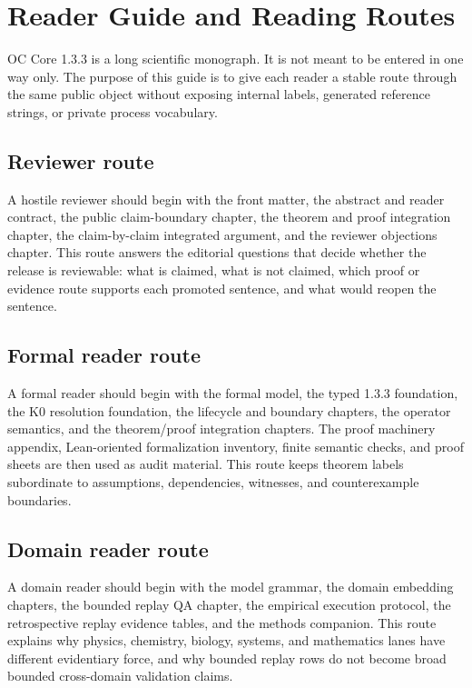 \section{Reader Guide and Reading Routes}
\label{sec:oc13-reader-contract}

OC Core 1.3.3 is a long scientific monograph. It is not meant to be entered in
one way only. The purpose of this guide is to give each reader a stable route
through the same public object without exposing internal labels, generated
reference strings, or private process vocabulary.

\subsection{Reviewer route}

A hostile reviewer should begin with the front matter, the abstract and reader
contract, the public claim-boundary chapter, the theorem and proof integration
chapter, the claim-by-claim integrated argument, and the reviewer objections
chapter. This route answers the editorial questions that decide whether the
release is reviewable: what is claimed, what is not claimed, which proof or
evidence route supports each promoted sentence, and what would reopen the
sentence.

\subsection{Formal reader route}

A formal reader should begin with the formal model, the typed 1.3.3 foundation,
the K0 resolution foundation, the lifecycle and boundary chapters, the operator
semantics, and the theorem/proof integration chapters. The proof machinery
appendix, Lean-oriented formalization inventory, finite semantic checks, and proof sheets are then used as
audit material. This route keeps theorem labels subordinate to assumptions,
dependencies, witnesses, and counterexample boundaries.

\subsection{Domain reader route}

A domain reader should begin with the model grammar, the domain embedding
chapters, the bounded replay QA chapter, the empirical execution protocol, the
retrospective replay evidence tables, and the methods companion. This route explains
why physics, chemistry, biology, systems, and mathematics lanes have different
evidentiary force, and why bounded replay rows do not become broad bounded cross-domain
validation claims.

